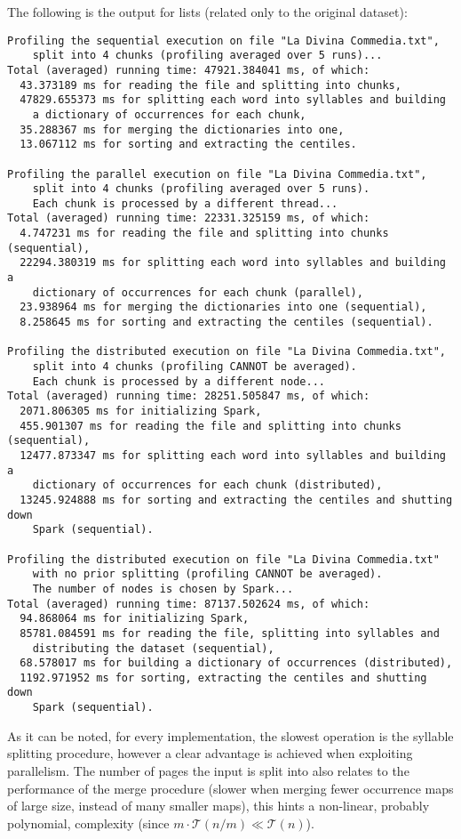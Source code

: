 The following is the output for lists (related only to the original dataset):
\begin{verbatim}
Profiling the sequential execution on file "La Divina Commedia.txt",
    split into 4 chunks (profiling averaged over 5 runs)...
Total (averaged) running time: 47921.384041 ms, of which:
  43.373189 ms for reading the file and splitting into chunks,
  47829.655373 ms for splitting each word into syllables and building
    a dictionary of occurrences for each chunk,
  35.288367 ms for merging the dictionaries into one,
  13.067112 ms for sorting and extracting the centiles.

Profiling the parallel execution on file "La Divina Commedia.txt",
    split into 4 chunks (profiling averaged over 5 runs).
    Each chunk is processed by a different thread...
Total (averaged) running time: 22331.325159 ms, of which:
  4.747231 ms for reading the file and splitting into chunks (sequential),
  22294.380319 ms for splitting each word into syllables and building a
    dictionary of occurrences for each chunk (parallel),
  23.938964 ms for merging the dictionaries into one (sequential),
  8.258645 ms for sorting and extracting the centiles (sequential).

Profiling the distributed execution on file "La Divina Commedia.txt",
    split into 4 chunks (profiling CANNOT be averaged).
    Each chunk is processed by a different node...
Total (averaged) running time: 28251.505847 ms, of which:
  2071.806305 ms for initializing Spark,
  455.901307 ms for reading the file and splitting into chunks (sequential),
  12477.873347 ms for splitting each word into syllables and building a
    dictionary of occurrences for each chunk (distributed),
  13245.924888 ms for sorting and extracting the centiles and shutting down
    Spark (sequential).

Profiling the distributed execution on file "La Divina Commedia.txt"
    with no prior splitting (profiling CANNOT be averaged).
    The number of nodes is chosen by Spark...
Total (averaged) running time: 87137.502624 ms, of which:
  94.868064 ms for initializing Spark,
  85781.084591 ms for reading the file, splitting into syllables and
    distributing the dataset (sequential),
  68.578017 ms for building a dictionary of occurrences (distributed),
  1192.971952 ms for sorting, extracting the centiles and shutting down
    Spark (sequential).
\end{verbatim}

As it can be noted, for every implementation, the slowest operation is the syllable splitting procedure, however a clear advantage is achieved when exploiting parallelism.
The number of pages the input is split into also relates to the performance of the merge procedure (slower when merging fewer occurrence maps of large size, instead of many smaller maps), this hints a non-linear, probably polynomial, complexity (since $m\cdot\mathcal{T}(n/m) \ll \mathcal{T}(n)$).


